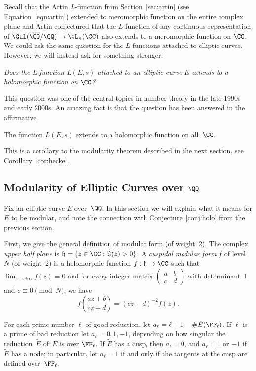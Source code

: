 Recall that the Artin $L$-function from Section~\ref{sec:artin}
(see Equation~\ref{eqn:artin}) extended to meromorphic function
on the entire complex plane and Artin conjectured that the $L$-function
of any continuous representation of $\Gal(\overline{\QQ}/\QQ) \to \GL_n(\CC)$ also
extends to a meromorphic function on $\CC$. We could ask the same
question for the $L$-functions attached to elliptic curves. However,
we will instead ask for something stronger:
\begin{center}
  \emph{Does the $L$-function $L(E,s)$ attached to an
    elliptic curve $E$ extends to a holomorphic function on $\CC$?}
\end{center}
This question was one of the central topics
in number theory in the late 1990s and early 2000s.
An amazing fact is that the question has been answered
in the affirmative.
\begin{theorem}\label{conj:holo}
  The function $L(E,s)$ extends to a holomorphic
  function on all~$\CC$.
\end{theorem}
This is a corollary to the modularity theorem described
in the next section, see Corollary~\ref{cor:hecke}.

\subsection{Modularity of Elliptic Curves over $\QQ$}

Fix an elliptic curve $E$ over~$\QQ$.  In this section we will explain
what it means for $E$ to be modular, and note the connection with
Conjecture~\ref{conj:holo} from the previous section.

First, we give the general definition of modular form (of weight~$2$).
The complex {\em upper half plane} is
$\mathfrak{h}  = \{z  \in \CC : \Im(z) > 0\}$.
A {\em cuspidal modular form} $f$ of level~$N$ (of weight~$2$) is a holomorphic
function $f : \mathfrak{h} \to \CC$ such that $\lim_{z\to i\infty} f(z) = 0$ and
for every integer matrix $\begin{pmatrix} a & b \\ c & d \end{pmatrix}$ with
determinant~$1$ and $c\equiv 0 \pmod{N}$, we have
\[
  f\left( \frac{az + b}{cz + d} \right) = (cz+d)^{-2} f(z).
\]

For each prime number $\ell$ of good reduction, let $a_\ell = \ell+1 -
\#\tilde{E}(\FF_\ell)$.  If $\ell$ is a prime of bad reduction let
$a_\ell = 0,1,-1$, depending on how singular the reduction~$\tilde{E}$
of~$E$ is over $\FF_\ell$.  If $\tilde{E}$ has a cusp, then $a_\ell=0$,
and $a_\ell=1$ or $-1$ if $\tilde{E}$ has a node; in particular,
let $a_\ell=1$ if and only if the tangents at the cusp are defined
over~$\FF_\ell$.


